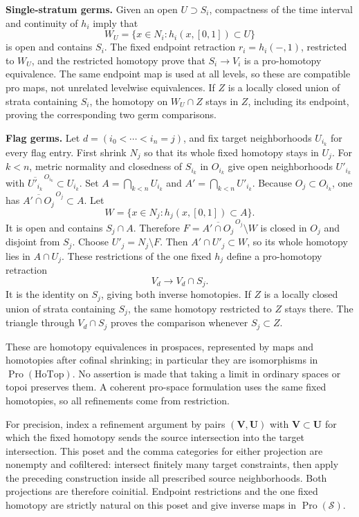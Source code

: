 \documentclass[11pt,a4paper]{article}
\theoremstyle{definition}
\begin{document}
\textbf{Single-stratum germs.} Given an open \(U\supset S_i\), compactness of the time interval and continuity of \(h_i\) imply that \[
 W_U=\{x\in N_i:h_i(x,[0,1])\subset U\}
\] is open and contains \(S_i\). The fixed endpoint retraction \(r_i=h_i(-,1)\), restricted to \(W_U\), and the restricted homotopy prove that \(S_i\to V_i\) is a pro-homotopy equivalence. The same endpoint map is used at all levels, so these are compatible pro maps, not unrelated levelwise equivalences. If \(Z\) is a locally closed union of strata containing \(S_i\), the homotopy on \(W_U\cap Z\) stays in \(Z\), including its endpoint, proving the corresponding two germ comparisons.

\textbf{Flag germs.} Let \(d=(i_0<\cdots<i_n=j)\), and fix target neighborhoods \(U_{i_k}\) for every flag entry. First shrink \(N_j\) so that its whole fixed homotopy stays in \(U_j\). For \(k<n\), metric normality and closedness of \(S_{i_k}\) in \(O_{i_k}\) give open neighborhoods \(U'_{i_k}\) with \(\overline{U'_{i_k}}^{\,O_{i_k}}\subset U_{i_k}\). Set \(A=\bigcap_{k<n}U_{i_k}\) and \(A'=\bigcap_{k<n}U'_{i_k}\). Because \(O_j\subset O_{i_k}\), one has \(\overline{A'\cap O_j}^{\,O_j}\subset A\). Let \[
 W=\{x\in N_j:h_j(x,[0,1])\subset A\}.
\] It is open and contains \(S_j\cap A\). Therefore \(F=\overline{A'\cap O_j}^{\,O_j}\setminus W\) is closed in \(O_j\) and disjoint from \(S_j\). Choose \(U'_j=N_j\setminus F\). Then \(A'\cap U'_j\subset W\), so its whole homotopy lies in \(A\cap U_j\). These restrictions of the one fixed \(h_j\) define a pro-homotopy retraction \[
 V_d\longrightarrow V_d\cap S_j.
\] It is the identity on \(S_j\), giving both inverse homotopies. If \(Z\) is a locally closed union of strata containing \(S_j\), the same homotopy restricted to \(Z\) stays there. The triangle through \(V_d\cap S_j\) proves the comparison whenever \(S_j\subset Z\).

These are homotopy equivalences in prospaces, represented by maps and homotopies after cofinal shrinking; in particular they are isomorphisms in \(\operatorname{Pro}(\mathrm{HoTop})\). No assertion is made that taking a limit in ordinary spaces or topoi preserves them. A coherent pro-space formulation uses the same fixed homotopies, so all refinements come from restriction.

For precision, index a refinement argument by pairs $(\mathbf V,\mathbf U)$
with $\mathbf V\subset\mathbf U$ for which the fixed homotopy sends the
source intersection into the target intersection. This poset and the
comma categories for either projection are nonempty and cofiltered:
intersect finitely many target constraints, then apply the preceding
construction inside all prescribed source neighborhoods. Both projections
are therefore coinitial. Endpoint restrictions and the one fixed homotopy
are strictly natural on this poset and give inverse maps in
$\operatorname{Pro}(\mathcal S)$.
\end{document}
